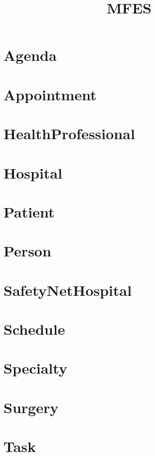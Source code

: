\documentclass{article}
\begin{document}
\title{MFES}
\author{}
\maketitle
\tableofcontents

\section{Agenda}

\section{Appointment}

\section{HealthProfessional}

\section{Hospital}

\section{Patient}

\section{Person}

\section{SafetyNetHospital}

\section{Schedule}

\section{Specialty}

\section{Surgery}

\section{Task}

\end{document}
